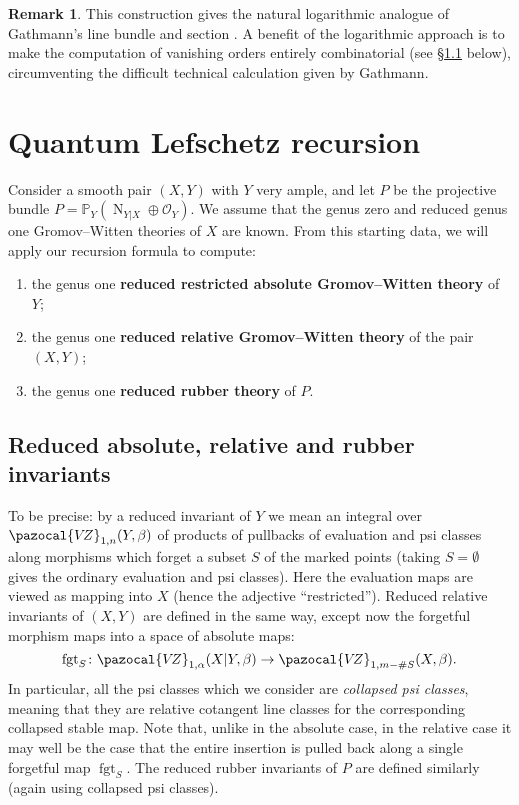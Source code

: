 \documentclass[11pt]{amsart}
\newcommand{\PP}{\mathbb P}
\newcommand{\VZ}{\pazocal{V\!Z}}
\newcommand{\OO}{\mathcal{O}}
\renewcommand{\to}{\rightarrow}
\newcommand{\fgt}{\operatorname{fgt}}
\theoremstyle{definition}
\theoremstyle{definition}
\newtheorem{remark}[thm]{Remark}
\begin{document}
\begin{remark} This construction gives the natural logarithmic analogue of Gathmann's line bundle and section \cite[Construction 2.1]{Ga}. A benefit of the logarithmic approach is to make the computation of vanishing orders entirely combinatorial (see \S \ref{} below), circumventing the difficult technical calculation given by Gathmann. \end{remark}

\newpage

\section{Quantum Lefschetz recursion}
Consider a smooth pair $(X,Y)$ with $Y$ very ample, and let $P$ be the projective bundle $P=\PP_Y(\operatorname{N}_{Y|X} \oplus\OO_Y)$. We assume that the genus zero and reduced genus one Gromov--Witten theories of $X$ are known. From this starting data, we will apply our recursion formula to compute:
\begin{enumerate}
\item the genus one \textbf{reduced restricted absolute Gromov--Witten theory} of $Y$;
\item the genus one \textbf{reduced relative Gromov--Witten theory} of the pair $(X,Y)$;
\item the genus one \textbf{reduced rubber theory} of $P$.
\end{enumerate}

\subsection{Reduced absolute, relative and rubber invariants} To be precise: by a reduced invariant of $Y$ we mean an integral over $\VZ_{1,n}(Y,\beta)$ of products of pullbacks of evaluation and psi classes along morphisms which forget a subset $S$ of the marked points (taking $S=\emptyset$ gives the ordinary evaluation and psi classes). Here the evaluation maps are viewed as mapping into $X$ (hence the adjective ``restricted''). Reduced relative invariants of $(X,Y)$ are defined in the same way, except now the forgetful morphism maps into a space of absolute maps:
\begin{equation*} \fgt_S \colon \VZ_{1,\alpha}(X|Y,\beta) \to \VZ_{1,m-\#S}(X,\beta).\end{equation*}
In particular, all the psi classes which we consider are \emph{collapsed psi classes}, meaning that they are relative cotangent line classes for the corresponding collapsed stable map. Note that, unlike in the absolute case, in the relative case it may well be the case that the entire insertion is pulled back along a single forgetful map $\fgt_S$. The reduced rubber invariants of $P$ are defined similarly (again using collapsed psi classes).
\end{document}
